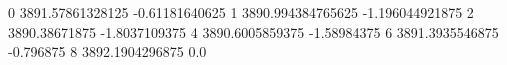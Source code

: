 0 3891.57861328125 -0.61181640625
1 3890.994384765625 -1.196044921875
2 3890.38671875 -1.8037109375
4 3890.6005859375 -1.58984375
6 3891.3935546875 -0.796875
8 3892.1904296875 0.0
